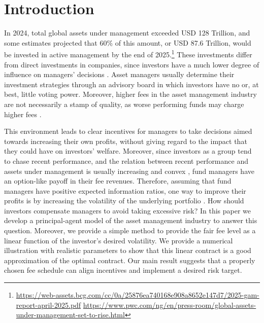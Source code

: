 \documentclass[11pt]{article}
\begin{document}
\doublespacing
{}
\setlength{\parindent}{1cm}

\section{Introduction}
In 2024, total global assets under management exceeded USD 128 Trillion, and some estimates projected that 60\% of this amount, or USD 87.6 Trillion, would be invested in active management by the end of 2025.\footnote{\url{https://web-assets.bcg.com/cc/0a/25876ea740168e908a8652e147d7/2025-gam-report-april-2025.pdf} 
\url{https://www.pwc.com/ng/en/press-room/global-assets-under-management-set-to-rise.html}} These investments  differ from direct investments in companies, since investors have a much lower degree of influence on managers' decisions \citep{BebchukCohenHirst2017}. Asset managers usually determine their investment strategies through an advisory board in which investors have no or, at best, little voting power. Moreover, higher fees in the asset management industry are not necessarily a stamp of quality, as worse performing funds may charge higher fees 
\citep{Gil-Bazo2008}.

This environment leads to clear incentives for managers to take decisions aimed towards increasing their own profits, without giving regard to the impact that they could have on investors' welfare. Moreover, since investors as a group tend to chase recent performance, and the relation between recent performance and assets under management is usually increasing and convex \citep{Ippolito1992ConsumerReaction, chevalier1997risk, sirri1998costly}, fund managers have an option-like payoff in their fee revenues. Therefore, assuming that fund managers have positive expected information ratios, one way to improve their profits is by increasing the volatility of the underlying portfolio \citep{BrownHarlowStarks1996}. 
How should investors compensate managers to avoid taking excessive risk? In this paper we develop a principal-agent model of the asset management industry to answer this question. Moreover, we provide a simple method to provide the fair fee level as a linear function of the investor's desired volatility. We provide a numerical illustration with realistic parameters to show that this linear contract is a good approximation of the optimal contract. Our main result suggests that a properly chosen fee schedule can align incentives and implement a desired risk target.
\end{document}
